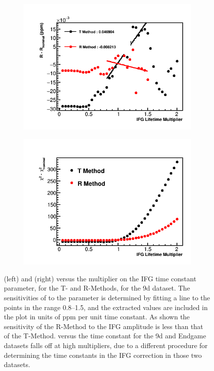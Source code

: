 \begin{figure}[h]
\centering
    \begin{subfigure}[t]{0.45\textwidth}
        \centering
        \includegraphics[width=\textwidth]{IFG_Lifetime_Compare_R_9d}
    \end{subfigure}%
    \hspace{1cm}
    \begin{subfigure}[t]{0.45\textwidth}
        \centering
        \includegraphics[width=\textwidth]{IFG_Lifetime_Compare_Chisq_9d}
    \end{subfigure}
\caption[]{\R (left) and \chisq (right) versus the multiplier on the IFG time constant parameter, for the T- and R-Methods, for the 9d dataset. The sensitivities of \R to the parameter is determined by fitting a line to the points in the range 0.8--1.5, and the extracted values are included in the plot in units of ppm per unit time constant. As shown the sensitivity of the R-Method to the IFG amplitude is less than that of the T-Method. \R versus the time constant for the 9d and Endgame datasets falls off at high multipliers, due to a different procedure for determining the time constants in the IFG correction in those two datasets.}
\label{fig:IFGtauscan9d}
\end{figure}





